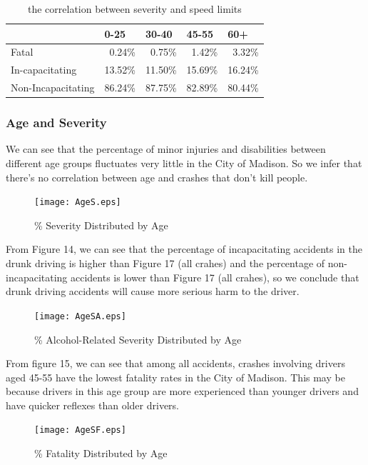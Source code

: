 \documentclass[15pt]{article}
\begin{document}
\begin{table}[htbp]
  \centering
  \caption{the correlation between severity and speed limits}
    \begin{tabular}{lrrrr}
    \hline
          & \multicolumn{1}{l}{0-25} & \multicolumn{1}{l}{30-40} & \multicolumn{1}{l}{45-55} & \multicolumn{1}{l}{60+} \\
    \hline
    Fatal & 0.24\% & 0.75\% & 1.42\% & 3.32\% \\
    In-capacitating & 13.52\% & 11.50\% & 15.69\% & 16.24\% \\
    Non-Incapacitating & 86.24\% & 87.75\% & 82.89\% & 80.44\% \\
    \hline
    \end{tabular}%
  \label{tab:addlabel}%
\end{table}%

\subsubsection{Age and Severity}
We can see that the percentage of minor injuries and disabilities between different age groups fluctuates very little in the City of Madison. So we infer that there's no correlation between age and crashes that don't kill people.
\begin{figure}[H]
\centering
\texttt{[image: AgeS.eps]}
\caption{\% Severity Distributed by Age}
\label{19}
\end{figure}

From Figure 14, we can see that the percentage of incapacitating accidents in the drunk driving is higher than Figure 17 (all crahes) and the percentage of non-incapacitating accidents is lower than Figure 17 (all crahes), so we conclude that drunk driving accidents will cause more serious harm to the driver.
\begin{figure}[H]
\centering
\texttt{[image: AgeSA.eps]}
\caption{\% Alcohol-Related Severity Distributed by Age}
\label{20}
\end{figure}

From figure 15, we can see that among all accidents, crashes involving drivers aged 45-55 have the lowest fatality rates in the City of Madison. This may be because drivers in this age group are more experienced than younger drivers and have quicker reflexes than older drivers.
\begin{figure}[H]
\centering
\texttt{[image: AgeSF.eps]}
\caption{\% Fatality Distributed by Age}
\label{21}
\end{figure}
\end{document}

